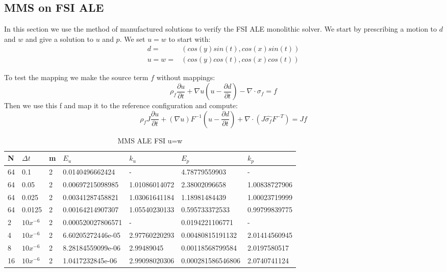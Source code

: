 \subsection{MMS on FSI ALE}
In this section we use the method of manufactured solutions to verify the FSI ALE monolithic solver. We start by prescribing a motion to $ d$ and $w$ and give a solution to $u$ and $p$. We set $u = w$ to start with:
\begin{align*}
d =& ( cos(y)sin(t) , cos(x)sin(t) )\\
u = w=& ( cos(y)cos(t), cos(x)cos(t) )
\end{align*}

To test the mapping we make the source term $f$ without mappings:
$$ \rho_f \frac{\partial u}{\partial t}  +  \nabla u (u-\frac{\partial d}{\partial t})  -  \nabla \cdot \sigma_f  = f $$
Then we use this f and map it to the reference configuration and compute:
$$ \rho_f J \frac{\partial u}{\partial t} + (\nabla u)F^{-1}(u-\frac{\partial d}{\partial t})  + \nabla \cdot( J \hat{\sigma_f} F^{-T}) = J f$$

\begin{table}[h!]
\centering
\caption{MMS ALE FSI u=w}
\label{my-label}
\begin{tabular}{|l|l|l|l|l|l|l|}
\hline
N & $\Delta t$ & m & $E_u$ & $k_u$ & $E_p$ & $k_p$ \\ \hline
64 & 0.1 & 2 & 0.0140496662424 & - & 4.78779559903 & - \\ \hline
64 & 0.05 & 2 & 0.00697215098985 & 1.01086014072 & 2.38002096658 & 1.00838727906 \\ \hline
64 & 0.025 & 2 & 0.00341287458821 & 1.03061641184 & 1.18981484439 & 1.00023719999 \\ \hline
64 & 0.0125 & 2 & 0.00164214907307 & 1.05540230133 & 0.595733372533 & 0.99799839775 \\ \hline
2 & $10x^{-6}$ & 2 & 0.000520027806571 & - & 0.0194221106771 & - \\ \hline
4 & $10x^{-6}$ & 2 & 6.60205272446e-05 & 2.97760220293 & 0.00480815191132 & 2.01414560945 \\ \hline
8 & $10x^{-6}$ & 2 & 8.28184559099e-06 & 2.99489045 & 0.00118568799584 & 2.0197580517 \\ \hline
16 & $10x^{-6}$ & 2 & 1.0417232845e-06 & 2.99098020306 & 0.000281586546806 & 2.0740741124 \\ \hline
\end{tabular}
\end{table}

\newpage
